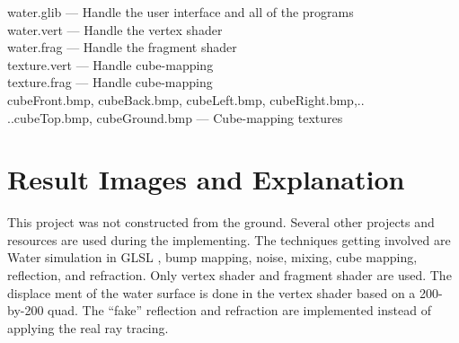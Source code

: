 \documentclass[letterpaper,14pt,titlepage,fleqn]{article}
\begin{document}
water.glib --- Handle the user interface and all of the programs\\
water.vert --- Handle the vertex shader\\
water.frag --- Handle the fragment shader\\
texture.vert --- Handle cube-mapping\\
texture.frag --- Handle cube-mapping\\
cubeFront.bmp, cubeBack.bmp, cubeLeft.bmp, cubeRight.bmp,..\\
  ..cubeTop.bmp, cubeGround.bmp --- Cube-mapping textures

\section{Result Images and Explanation}
This project was not constructed from the ground. Several other projects and resources are used during the implementing. The techniques getting involved are Water simulation in GLSL \cite{waterSimu}, bump mapping, noise, mixing, cube mapping, reflection, and refraction. Only vertex shader and fragment shader are used. The displace ment of the water surface is done in the vertex shader based on a 200-by-200 quad. The ``fake'' reflection and refraction are implemented instead of applying the real ray tracing. 
\end{document}
